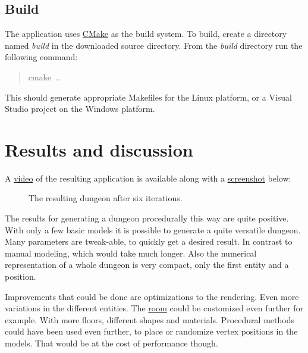 \documentclass[a4paper]{article}
\begin{document}
\subsection{Build%
  \label{build}%
}

The application uses \href{https://cmake.org/}{CMake} as the build system. To build, create a directory named \emph{build} in the downloaded source  directory. From the \emph{build} directory run the following command:
%
\begin{quote}{\ttfamily \raggedright \noindent
cmake~..
}
\end{quote}

This should generate appropriate Makefiles for the Linux platform, or a Visual Studio project on the Windows platform.


\section{Results and discussion%
  \label{results-and-discussion}%
}

A \href{https://www.youtube.com/watch?v=-ZhnmNAsNJo}{video} of the resulting application is available along with a \hyperref[screenshot]{screenshot} below:

\begin{figure}
\noindent{}\label{screenshot}

\caption{The resulting dungeon after six iterations.}
\end{figure}

The results for generating a dungeon procedurally this way are quite positive. With only a few basic models it is possible to generate a quite versatile dungeon. Many parameters are tweak-able, to quickly get a desired result. In contrast to manual modeling, which would take much longer. Also the numerical representation of a whole dungeon is very compact, only the first entity and a position.

Improvements that could be done are optimizations to the rendering. Even more variations in the different entities. The \hyperref[room]{room} could be customized even further for example. With more floors, different shapes and materials. Procedural methods could have been used even further, to place or randomize vertex positions in the models. That would be at the cost of performance though.
\end{document}
